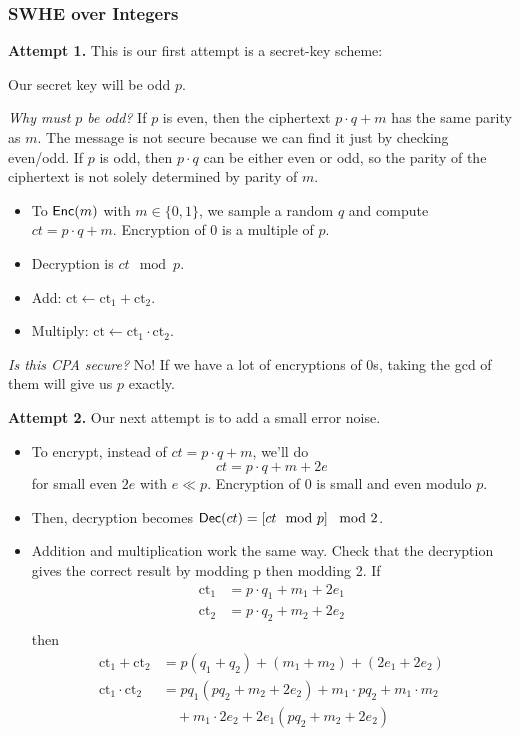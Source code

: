 \subsubsection{SWHE over Integers}\label{sec:apr06-swhe-integers}
\textbf{Attempt 1.} This is our first attempt is a secret-key scheme:

Our secret key will be odd $p$.

\begin{remark}
    \textit{Why must $p$ be odd?} If $p$ is even, then the ciphertext $p\cdot q + m$ has the same parity as $m$. The message is not secure because we can find it just by checking even/odd. If $p$ is odd, then $p\cdot q$ can be either even or odd, so the parity of the ciphertext is not solely determined by parity of $m$.
\end{remark}

\begin{itemize}
    \item To $\operatorname{\mathsf{Enc}}(m)$ with $m\in \{0, 1\}$, we sample a random $q$ and compute $ct = p\cdot q + m$. Encryption of $0$ is a multiple of $p$.
    \item Decryption is $ct\mod p$.
    \item Add: $\text{ct} \gets \text{ct}_1 + \text{ct}_2$.
    \item Multiply: $\text{ct} \gets \text{ct}_1 \cdot \text{ct}_2 $.
\end{itemize}

\emph{Is this CPA secure?} No! If we have a lot of encryptions of $0$s, taking the gcd of them will give us $p$ exactly.

\textbf{Attempt 2.} Our next attempt is to add a small error noise.

\begin{itemize}
    \item To encrypt, instead of $ct = p\cdot q + m$, we'll do
          \[ct = p\cdot q + m + 2e\]
          for small even $2e$ with $e \ll p$. Encryption of $0$ is small and even modulo $p$.
    \item Then, decryption becomes $\operatorname{\mathsf{Dec}}(ct) = \left[ ct\mod p \right]\mod 2$.
    \item Addition and multiplication work the same way. Check that the decryption gives the correct result by modding p then modding 2. If
    \begin{align*}
        \text{ct}_1 &= p \cdot q_1 + m_1 + 2e_1 \\
        \text{ct}_2 &= p \cdot q_2 + m_2 + 2e_2 \\
    \end{align*}
    then
    \begin{align*}
        \text{ct}_1 + \text{ct}_2 &= p(q_1 + q_2) + (m_1 + m_2) + (2e_1 + 2e_2)\\
        \text{ct}_1 \cdot \text{ct}_2 &= pq_1(pq_2 + m_2 + 2e_2) + m_1 \cdot pq_2 + m_1 \cdot m_2\\
        & \quad + m_1 \cdot 2e_2 + 2e_1(pq_2 + m_2 + 2e_2)\\
    \end{align*}
\end{itemize}

